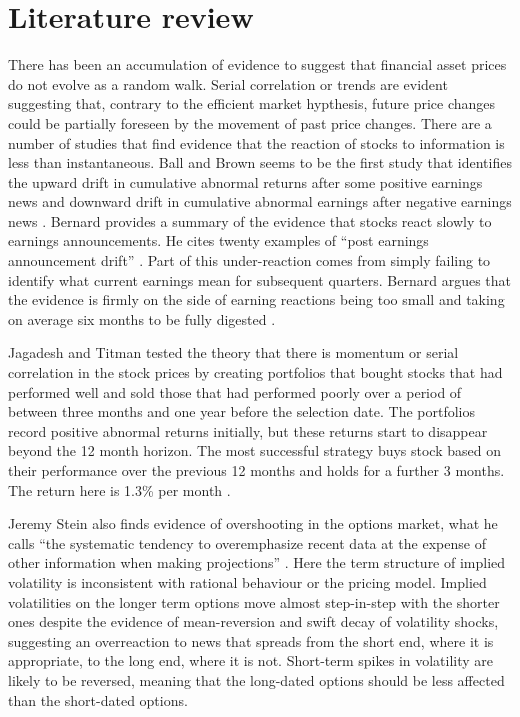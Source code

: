 \documentclass[12pt, a4paper, oneside]{article} %
\begin{document}
\section{Literature review}  
There has been an accumulation of evidence to suggest that financial asset prices do not evolve as a random walk.  Serial correlation or trends are evident suggesting that, contrary to the efficient market hypthesis, future price changes could be partially foreseen by the movement of past price changes.  There are a number of studies that find evidence that the reaction of stocks to information is less than instantaneous.  Ball and Brown seems to be the first study that identifies the upward drift in cumulative abnormal returns after some positive earnings news and downward drift in cumulative abnormal earnings after negative earnings news \citep{BallBrown}.  Bernard provides a summary of the evidence that stocks react slowly to earnings announcements.  He cites twenty examples of ``post earnings announcement drift'' \citep[p. 303]{BernardDrift}.  Part of this under-reaction comes from simply failing to identify what current earnings mean for subsequent quarters.    Bernard argues that the evidence is firmly on the side of earning reactions being too small and taking on average six months to be fully digested \citep[p. 305]{BernardDrift}. 

Jagadesh and Titman tested the theory that there is momentum or serial correlation in the stock prices by creating portfolios that bought stocks that had performed well and sold those that had performed poorly over a period of between three months and one year before the selection date.  The portfolios record positive abnormal returns initially, but these returns start to disappear beyond the 12 month horizon.  The most successful strategy buys stock based on their performance over the previous 12 months and holds for a further 3 months.  The return here is 1.3\% per month \citep{Jagadeesh}.   

Jeremy Stein also finds evidence of overshooting in the options market, what he calls ``the systematic tendency to overemphasize recent data at the expense of other information when making projections'' \citep[p 1011]{SteinOptions}. Here the term structure of implied volatility is inconsistent with rational behaviour or the pricing model.  Implied volatilities on the longer term options move almost step-in-step with the shorter ones despite the evidence of mean-reversion and swift decay of volatility shocks, suggesting an overreaction to news that spreads from the short end, where it is appropriate, to the long end, where it is not.   Short-term spikes in volatility are likely to be reversed, meaning that the long-dated options should be less affected than the short-dated options. 
\end{document}
